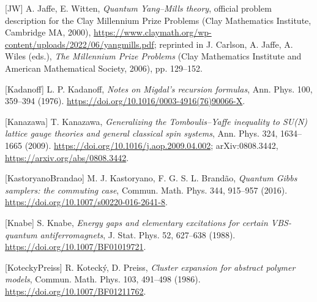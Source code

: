 \documentclass[10pt,letterpaper,twocolumn]{article}
\begin{document}
{[}JW{]} A. Jaffe, E. Witten, \emph{Quantum Yang--Mills theory}, official problem description for the Clay Millennium Prize Problems (Clay Mathematics Institute, Cambridge MA, 2000), \href{https://www.claymath.org/wp-content/uploads/2022/06/yangmills.pdf}{https:\allowbreak{}/\allowbreak{}/\allowbreak{}www.\allowbreak{}claymath\allowbreak{}.\allowbreak{}org/\allowbreak{}wp-\allowbreak{}content/\allowbreak{}uploads/\allowbreak{}2022/\allowbreak{}06/\allowbreak{}yangmill\allowbreak{}s.\allowbreak{}pdf}; reprinted in J. Carlson, A. Jaffe, A. Wiles (eds.), \emph{The Millennium Prize Problems} (Clay Mathematics Institute and American Mathematical Society, 2006), pp. 129--152.

{[}Kadanoff{]} L. P. Kadanoff, \emph{Notes on Migdal's recursion formulas}, Ann. Phys. 100, 359--394 (1976). \href{https://doi.org/10.1016/0003-4916(76)90066-X}{https:\allowbreak{}/\allowbreak{}/\allowbreak{}doi.\allowbreak{}org/\allowbreak{}10.\allowbreak{}1016/\allowbreak{}0003-\allowbreak{}4916(\allowbreak{}76)\allowbreak{}90066-\allowbreak{}X}.

{[}Kanazawa{]} T. Kanazawa, \emph{Generalizing the Tomboulis--Yaffe inequality to SU(N) lattice gauge theories and general classical spin systems}, Ann. Phys. 324, 1634--1665 (2009). \href{https://doi.org/10.1016/j.aop.2009.04.002}{https:\allowbreak{}/\allowbreak{}/\allowbreak{}doi.\allowbreak{}org/\allowbreak{}10.\allowbreak{}1016/\allowbreak{}j.\allowbreak{}aop.\allowbreak{}2009.\allowbreak{}04.\allowbreak{}002}; arXiv:0808.3442, \href{https://arxiv.org/abs/0808.3442}{https:\allowbreak{}/\allowbreak{}/\allowbreak{}arxiv.\allowbreak{}org/\allowbreak{}abs/\allowbreak{}0808.\allowbreak{}3442}.

{[}KastoryanoBrandao{]} M. J. Kastoryano, F. G. S. L. Brandão, \emph{Quantum Gibbs samplers: the commuting case}, Commun. Math. Phys. 344, 915--957 (2016). \href{https://doi.org/10.1007/s00220-016-2641-8}{https:\allowbreak{}/\allowbreak{}/\allowbreak{}doi.\allowbreak{}org/\allowbreak{}10.\allowbreak{}1007/\allowbreak{}s00220-\allowbreak{}016-\allowbreak{}2641-\allowbreak{}8}.

{[}Knabe{]} S. Knabe, \emph{Energy gaps and elementary excitations for certain VBS-quantum antiferromagnets}, J. Stat. Phys. 52, 627--638 (1988). \href{https://doi.org/10.1007/BF01019721}{https:\allowbreak{}/\allowbreak{}/\allowbreak{}doi.\allowbreak{}org/\allowbreak{}10.\allowbreak{}1007/\allowbreak{}BF010197\allowbreak{}21}.

{[}KoteckyPreiss{]} R. Kotecký, D. Preiss, \emph{Cluster expansion for abstract polymer models}, Commun. Math. Phys. 103, 491--498 (1986). \href{https://doi.org/10.1007/BF01211762}{https:\allowbreak{}/\allowbreak{}/\allowbreak{}doi.\allowbreak{}org/\allowbreak{}10.\allowbreak{}1007/\allowbreak{}BF012117\allowbreak{}62}.
\end{document}

